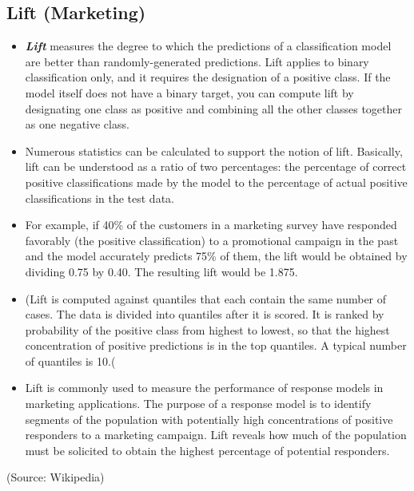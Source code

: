 \subsection{Lift (Marketing) }
\begin{itemize}
\item \textbf{\textit{Lift}} measures the degree to which the predictions of a classification model are better than randomly-generated predictions. Lift applies to binary classification only, and it requires the designation of a positive class. If the model itself does not have a binary target, you can compute lift by designating one class as positive and combining all the other classes together as one negative class.

\item Numerous statistics can be calculated to support the notion of lift. Basically, lift can be understood as a ratio of two percentages: the percentage of correct positive classifications made by the model to the percentage of actual positive classifications in the test data.

\item For example, if 40\% of the customers in a marketing survey have responded favorably (the positive classification) to a promotional campaign in the past and the model accurately predicts 75\% of them, the lift would be obtained by dividing 0.75 by 0.40. The resulting lift would be 1.875.

\item (Lift is computed against quantiles that each contain the same number of cases. The data is divided into quantiles after it is scored. It is ranked by probability of the positive class from highest to lowest, so that the highest concentration of positive predictions is in the top quantiles. A typical number of quantiles is 10.(

\item Lift is commonly used to measure the performance of response models in marketing applications. The purpose of a response model is to identify segments of the population with potentially high concentrations of positive responders to a marketing campaign. Lift reveals how much of the population must be solicited to obtain the highest percentage of potential responders.

\end{itemize}
(Source: Wikipedia)

